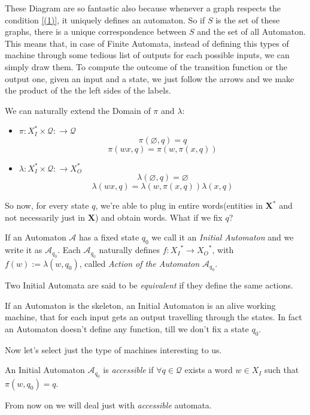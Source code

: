 \documentclass[mat1]{fmfdeloTS}
\newcommand{\abece}{\mathbf X}
\newcommand{\fslovar}{\mathbf{X^*}}
\newcommand{\auto}{\mathcal{A}}
\newcommand{\QQ}{\mathcal{Q}}
\begin{document}
These Diagram are so fantastic also because whenever a graph respects the condition \ref{(1)}, it uniquely defines an automaton. So if $S$ is the set of these graphs, there is a unique correspondence between $S$ and the set of all Automaton. This means that, in case of Finite Automata, instead of defining this types of machine through some tedious list of outputs for each possible inputs, we can simply draw them. To compute the outcome of the transition function or the output one, given an input and a state, we just follow the arrows and we make the product of the the left sides of the labels.

\begin{proposition}
We can naturally extend the Domain of $\pi$ and $\lambda$:
\begin{itemize}
	\item $\pi:X_{I}^{*} \times \QQ:\longrightarrow \QQ $
	$$\pi(\varnothing,q)=q$$ $$\pi(w x,q)=\pi(w,\pi(x,q))$$
	\item $\lambda:X_{I}^{*} \times \QQ:\longrightarrow X_{O}^{*}$
	$$\lambda(\varnothing,q)=\varnothing$$ $$\lambda(w x,q)=\lambda(w,\pi(x,q))\lambda(x,q)$$
\end{itemize}
\end{proposition}
So now, for every state $q$, we're able to plug in entire words(entities in $\fslovar$ and not necessarily just in $\abece$) and obtain words. What if we fix $q$?

\begin{definition}
If an  Automaton $\auto$ has a fixed state $q_0$ we call it an \textit{Initial  Automaton} and we write it as $\auto_{q_0}$. Each $\auto_{q_0}$ naturally defines $f:{X_I}^*\longrightarrow {X_O}^*$, with $f(w):=\lambda(w,q_0)$, called \emph{Action of the  Automaton $\auto_{q_0}$}.
\end{definition}

\begin{definition}
Two Initial Automata are said to be \textit{equivalent} if they define the same actions.
\end{definition}


If an Automaton is the skeleton, an Initial Automaton is an alive working machine, that for each input gets an output travelling through the states. In fact an Automaton doesn't define any function, till we don't fix a state $q_0$.

Now let's select just the type of machines interesting to us.
\begin{definition}
An Initial Automaton $\auto_{q_0}$ is \textit{accessible} if $\forall q\in\QQ$ exists a word $w\in X_I$ such that $\pi(w,q_0)=q$.
\end{definition}
From now on we will deal just with \textit{accessible} automata.
\end{document}
